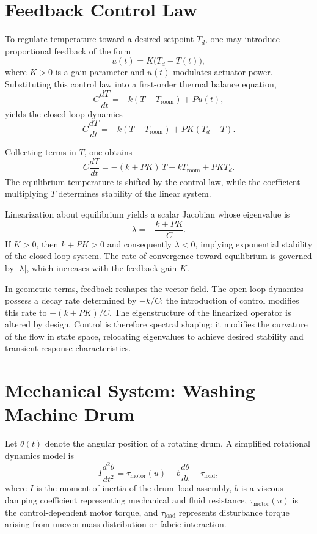 \documentclass[12pt]{book}
\begin{document}
\section{Feedback Control Law}

To regulate temperature toward a desired setpoint $T_d$, one may
introduce proportional feedback of the form
\[
u(t) = K \big( T_d - T(t) \big),
\]
where $K > 0$ is a gain parameter and $u(t)$ modulates actuator
power. Substituting this control law into a first-order thermal
balance equation,
\[
C \frac{dT}{dt}
=
- k (T - T_{\text{room}})
+
P u(t),
\]
yields the closed-loop dynamics
\[
C \frac{dT}{dt}
=
- k (T - T_{\text{room}})
+
P K (T_d - T).
\]

Collecting terms in $T$, one obtains
\[
C \frac{dT}{dt}
=
- (k + P K)\, T
+
k T_{\text{room}}
+
P K T_d.
\]
The equilibrium temperature is shifted by the control law, while
the coefficient multiplying $T$ determines stability of the linear
system.

Linearization about equilibrium yields a scalar Jacobian whose
eigenvalue is
\[
\lambda
=
- \frac{k + P K}{C}.
\]
If $K > 0$, then $k + P K > 0$ and consequently $\lambda < 0$,
implying exponential stability of the closed-loop system. The rate
of convergence toward equilibrium is governed by $|\lambda|$,
which increases with the feedback gain $K$.

In geometric terms, feedback reshapes the vector field. The open-loop
dynamics possess a decay rate determined by $-k/C$; the introduction
of control modifies this rate to $-(k + P K)/C$. The eigenstructure
of the linearized operator is altered by design. Control is therefore
spectral shaping: it modifies the curvature of the flow in state
space, relocating eigenvalues to achieve desired stability and
transient response characteristics.

\section{Mechanical System: Washing Machine Drum}

Let $\theta(t)$ denote the angular position of a rotating drum.
A simplified rotational dynamics model is
\[
I \frac{d^2 \theta}{dt^2}
=
\tau_{\text{motor}}(u)
-
b \frac{d\theta}{dt}
-
\tau_{\text{load}},
\]
where $I$ is the moment of inertia of the drum--load assembly,
$b$ is a viscous damping coefficient representing mechanical and
fluid resistance, $\tau_{\text{motor}}(u)$ is the control-dependent
motor torque, and $\tau_{\text{load}}$ represents disturbance torque
arising from uneven mass distribution or fabric interaction.
\end{document}
